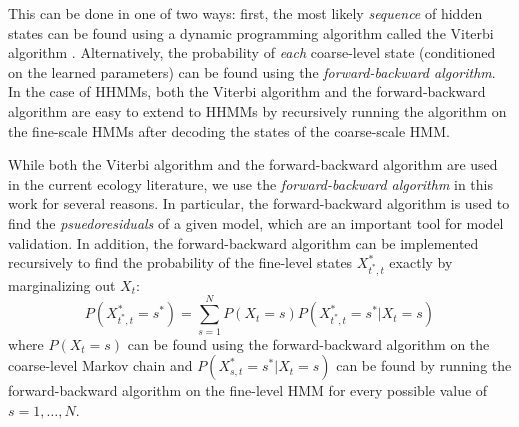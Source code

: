 This can be done in one of two ways: first, the most likely \textit{sequence} of  hidden states can be found using a dynamic programming algorithm called the Viterbi algorithm \cite{Viterbi:1967}. Alternatively, the probability of \textit{each} coarse-level state (conditioned on the learned parameters) can be found using the \textit{forward-backward algorithm}. In the case of HHMMs, both the Viterbi algorithm and the forward-backward algorithm are easy to extend to HHMMs by recursively running the algorithm on the fine-scale HMMs after decoding the states of the coarse-scale HMM.

While both the Viterbi algorithm and the forward-backward algorithm are used in the current ecology literature, we use the \textit{forward-backward algorithm} in this work for several reasons. In particular, the forward-backward algorithm is used to find the \textit{psuedoresiduals} of a given model, which are an important tool for model validation. In addition, the forward-backward algorithm can be implemented recursively to find the probability of the fine-level states $X^*_{t^*,t}$ exactly by marginalizing out $X_t$:
%
$$P(X^*_{t^*,t} = s^*) = \sum_{s=1}^N P(X_t = s)P(X^*_{t^*,t} = s^* | X_t = s)$$
%
where $P(X_t = s)$ can be found using the forward-backward algorithm on the coarse-level Markov chain and $P(X^*_{s,t} = s^* | X_t = s)$ can be found by running the forward-backward algorithm on the fine-level HMM for every possible value of $s = 1, \ldots, N$.